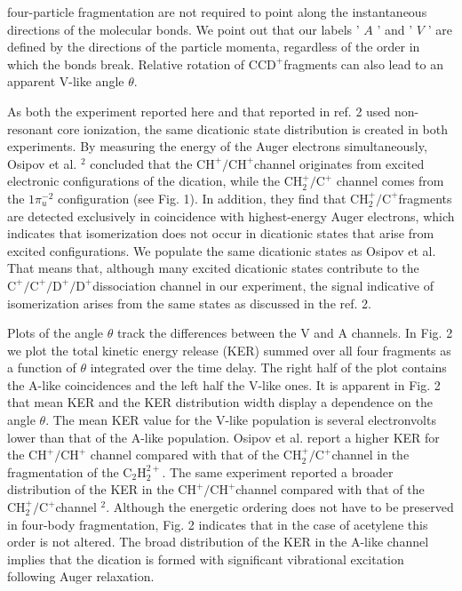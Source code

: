 \documentclass[10pt]{article}
\begin{document}
four-particle fragmentation are not required to point along the instantaneous directions of the molecular bonds. We point out that our labels ' $A$ ' and ' $V$ ' are defined by the directions of the particle momenta, regardless of the order in which the bonds break. Relative rotation of $\mathrm{CCD}^{+}$fragments can also lead to an apparent V-like angle $\theta$.

As both the experiment reported here and that reported in ref. 2 used non-resonant core ionization, the same dicationic state distribution is created in both experiments. By measuring the energy of the Auger electrons simultaneously, Osipov et al. ${ }^{2}$ concluded that the $\mathrm{CH}^{+} / \mathrm{CH}^{+}$channel originates from excited electronic configurations of the dication, while the $\mathrm{CH}_{2}^{+} / \mathrm{C}^{+}$ channel comes from the $1 \pi_{u}^{-2}$ configuration (see Fig. 1). In addition, they find that $\mathrm{CH}_{2}^{+} / \mathrm{C}^{+}$fragments are detected exclusively in coincidence with highest-energy Auger electrons, which indicates that isomerization does not occur in dicationic states that arise from excited configurations. We populate the same dicationic states as Osipov et al. That means that, although many excited dicationic states contribute to the $\mathrm{C}^{+} / \mathrm{C}^{+} / \mathrm{D}^{+} / \mathrm{D}^{+}$dissociation channel in our experiment, the signal indicative of isomerization arises from the same states as discussed in the ref. 2.

Plots of the angle $\theta$ track the differences between the V and A channels. In Fig. 2 we plot the total kinetic energy release (KER) summed over all four fragments as a function of $\theta$ integrated over the time delay. The right half of the plot contains the A-like coincidences and the left half the V-like ones. It is apparent in Fig. 2 that mean KER and the KER distribution width display a dependence on the angle $\theta$. The mean KER value for the V-like population is several electronvolts lower than that of the A-like population. Osipov et al. report a higher KER for the $\mathrm{CH}^{+} / \mathrm{CH}^{+}$ channel compared with that of the $\mathrm{CH}_{2}^{+} / \mathrm{C}^{+}$channel in the fragmentation of the $\mathrm{C}_{2} \mathrm{H}_{2}^{2+}$. The same experiment reported a broader distribution of the KER in the $\mathrm{CH}^{+} / \mathrm{CH}^{+}$channel compared with that of the $\mathrm{CH}_{2}^{+} / \mathrm{C}^{+}$channel ${ }^{2}$. Although the energetic ordering does not have to be preserved in four-body fragmentation, Fig. 2 indicates that in the case of acetylene this order is not altered. The broad distribution of the KER in the A-like channel implies that the dication is formed with significant vibrational excitation following Auger relaxation.
\end{document}

